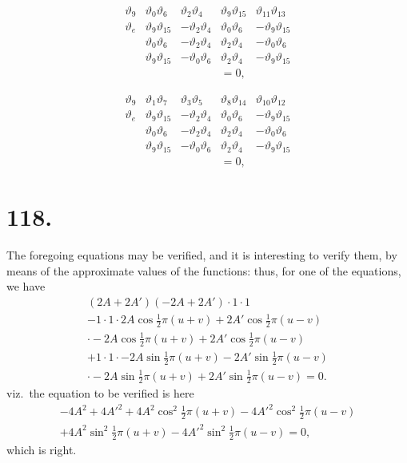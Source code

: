 \documentclass[11pt,a4paper]{article}
\newcommand{\uth}[1]{\vartheta_{#1}}
\begin{document}
\[
\begin{array}{c|cccc}
\uth{9} & \uth{0}\uth{6} & \uth{2}\uth{4} & \uth{9}\uth{15} & \uth{11}\uth{13} \\
\hline
\uth{e} & \uth{9}\uth{15} & -\uth{2}\uth{4} & \uth{0}\uth{6} & -\uth{9}\uth{15} \\
& \uth{0}\uth{6} & -\uth{2}\uth{4} & \uth{2}\uth{4} & -\uth{0}\uth{6} \\
& \uth{9}\uth{15} & -\uth{0}\uth{6} & \uth{2}\uth{4} & -\uth{9}\uth{15} \\
& & & = 0,
\end{array}
\]

\[
\begin{array}{c|cccc}
\uth{9} & \uth{1}\uth{7} & \uth{3}\uth{5} & \uth{8}\uth{14} & \uth{10}\uth{12} \\
\hline
\uth{e} & \uth{9}\uth{15} & -\uth{2}\uth{4} & \uth{0}\uth{6} & -\uth{9}\uth{15} \\
& \uth{0}\uth{6} & -\uth{2}\uth{4} & \uth{2}\uth{4} & -\uth{0}\uth{6} \\
& \uth{9}\uth{15} & -\uth{0}\uth{6} & \uth{2}\uth{4} & -\uth{9}\uth{15} \\
& & & = 0,
\end{array}
\]

\newpage
\section*{118.}
\label{sec:118}

The foregoing equations may be verified, and it is interesting to verify them, by means of the approximate values of the functions: thus, for one of the equations, we have
\begin{multline*}
(2A + 2A')(-2A + 2A') \cdot 1 \cdot 1 \\
- 1 \cdot 1 \cdot 2A\cos\tfrac{1}{2}\pi(u+v) + 2A'\cos\tfrac{1}{2}\pi(u-v) \\
\cdot -2A\cos\tfrac{1}{2}\pi(u+v) + 2A'\cos\tfrac{1}{2}\pi(u-v) \\
+ 1 \cdot 1 \cdot -2A\sin\tfrac{1}{2}\pi(u+v) - 2A'\sin\tfrac{1}{2}\pi(u-v) \\
\cdot -2A\sin\tfrac{1}{2}\pi(u+v) + 2A'\sin\tfrac{1}{2}\pi(u-v) = 0.
\end{multline*}
viz.\ the equation to be verified is here
\begin{multline*}
-4A^2 + 4A'^2 + 4A^2\cos^2\tfrac{1}{2}\pi(u+v) - 4A'^2\cos^2\tfrac{1}{2}\pi(u-v) \\
+ 4A^2\sin^2\tfrac{1}{2}\pi(u+v) - 4A'^2\sin^2\tfrac{1}{2}\pi(u-v) = 0,
\end{multline*}
which is right.
\end{document}
